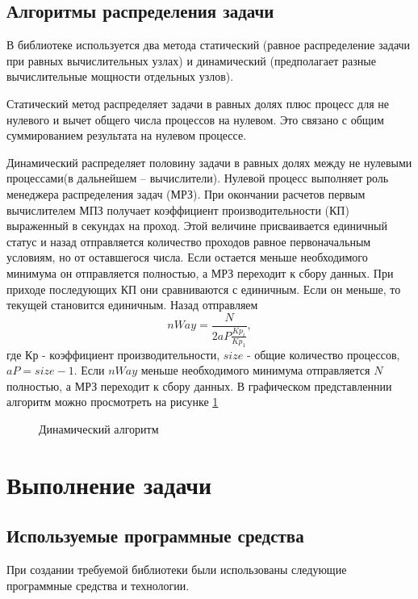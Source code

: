 \section{Алгоритмы распределения задачи}
В библиотеке используется два метода статический (равное распределение задачи при равных вычислительных узлах) и динамический (предполагает разные вычислительные мощности отдельных узлов).

Статический метод распределяет задачи в равных долях плюс процесс для не нулевого и вычет общего числа процессов на нулевом. Это связано с общим суммированием результата на нулевом процессе.

Динамический распределяет половину задачи в равных долях между не нулевыми процессами(в дальнейшем -- вычислители). Нулевой процесс выполняет роль менеджера распределения задач (МРЗ). При окончании расчетов первым вычислителем МПЗ получает коэффициент производительности (КП) выраженный в секундах на проход. Этой величине присваивается единичный статус и назад отправляется количество проходов равное первоначальным условиям, но от оставшегося числа. Если остается меньше необходимого минимума он отправляется полностью, а МРЗ переходит к сбору данных. При приходе последующих КП они сравниваются с единичным. Если он меньше, то текущей становится единичным. Назад отправляем \begin{equation} nWay = \frac{N}{2aP\frac{Kp_{i}}{Kp_{1}}}, \end{equation} где Кр - коэффициент производительности, $size$ - общие количество процессов, $aP=size-1$. Если $nWay$ меньше необходимого минимума отправляется $N$ полностью, а МРЗ переходит к сбору данных. В графическом представленнии алгоритм можно просмотреть на рисунке \ref{staticAndDinamic}

\begin{figure}
\begin{small}

\end{small}
\caption{Динамический алгоритм}
\label{staticAndDinamic}
\end{figure}

\chapter{Выполнение задачи}
\section{Используемые программные средства}
При создании требуемой библиотеки были использованы следующие программные средства и технологии.   

